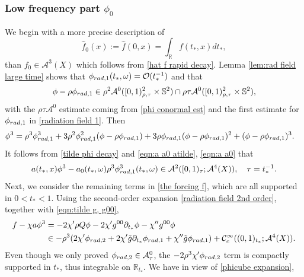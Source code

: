 \documentclass[10pt,a4paper,reqno]{amsart}
\newcommand{\CcI}{\mathcal{C}_c^\infty}
\newcommand{\RR}{\mathbb{R}}
\newcommand{\A}{\mathcal{A}}
\newcommand{\pa}{\partial}
\newcommand{\ti}{\tilde}
\theoremstyle{definition}
\theoremstyle{remark}
\numberwithin{equation}{section}
\newcommand{\ts}{t_*}
\newcommand{\wh}{\widehat}
\begin{document}
\subsubsection{Low frequency part $\phi_0$}
\label{subsubsection:low frequency part}
We begin with a more precise description of 
\[
	\wh{f}_0 (x) := \wh{f}(0,x) = \int_\RR f(\ts,x) d\ts,
\]
than $f_0\in \A^3(X)$ which follows from \eqref{hat f rapid decay}.
Lemma \ref{lem:rad field large time} shows that $\phi_{{\rm rad},1} (\ts,\omega) = \mathcal{O}(\ts^{-1})$ and that 
\begin{equation}
\label{tilde phi decay}
	\phi-\rho\phi_{{\rm rad},1} \in \rho^2 \A^0 ([0,1)_{\rho,\tau}^2 \times \mathbb{S}^2) \cap \rho\tau \A^0 ([0,1)_{\rho,\tau}^2 \times \mathbb{S}^2),
\end{equation}
with the $\rho\tau\A^0$ estimate coming from \eqref{phi conormal est} and the first estimate for $\phi_{{\rm rad},1}$ in \eqref{radiation field 1}.  Then
\begin{equation}
	\label{phicube explicit}
	\begin{split}
		\phi^3 &= \rho^3\phi_{\rm rad,1}^3 + 3\rho^2\phi_{\rm rad,1}^2(\phi-\rho\phi_{{\rm rad},1}) + 3\rho\phi_{\rm rad,1}(\phi-\rho\phi_{{\rm rad},1})^2 + (\phi-\rho\phi_{{\rm rad},1})^3.
	\end{split}
\end{equation}
It follows from \eqref{tilde phi decay} and \eqref{eqn:a a0 atilde}, \eqref{eqn:a a0} that
\begin{equation}
\label{phicube expansion}
	a(\ts,x) \phi^3 - a_0(\ts,\omega)\rho^3 \phi_{\rm rad,1}^3(\ts,\omega) \in  \A^2([0,1)_{\tau} ; \A^4(X)),\quad \tau=t_*^{-1}.
\end{equation}
Next, we consider the remaining terms in \eqref{the forcing f}, which are all supported in $0<\ts<1$. Using the second-order expansion \eqref{radiation field 2nd order}, together with \eqref{eqn:tilde g, g00}, 
\begin{equation}
	\begin{split}
		f - \chi a\phi^3 &= -2\chi'\rho Q\phi - 2\chi' g^{00}\pa_{\ts}\phi - \chi''g^{00}\phi \\
		&\in -\rho^3(2\chi' \phi_{\rm{rad},2} + 2\chi' \ti{g} \pa_{\ts}\phi_{\rm{rad},1} + \chi'' \ti{g}\phi_{\rm{rad},1}) + \CcI((0,1)_{\ts};\A^4(X)).
	\end{split}
 \label{eq:f expansion}
\end{equation}
Even though we only proved $\phi_{{\rm rad},2} \in \A^0_\tau$, the $-2\rho^3\chi'\phi_{{\rm rad},2}$ term is compactly supported in $t_*$, thus integrable on $\RR_{\ts}$. We have in view of \eqref{phicube expansion}, 
\end{document}
